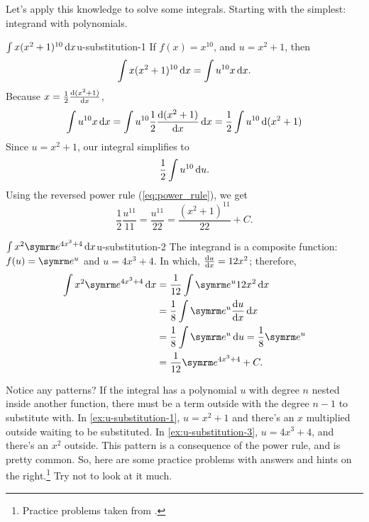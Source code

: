 Let's apply this knowledge to solve some integrals. Starting with the simplest: integrand with polynomials.
\begin{exmp}{$\int x(x^2 + 1)^{10}\odif{x}$}{u-substitution-1}
  If $f(x) = x^{10}$, and $u = x^2 + 1$, then
  \begin{equation}
    \int x(x^2 + 1)^{10}\odif{x} = \int u^{10}x\odif{x}.
  \end{equation}
  Because $x = \frac{1}{2}\odv{(x^2 + 1)}{x}$,
  \begin{equation}
    \int u^{10}x\odif{x} = \int u^{10}\frac{1}{2}\odv{(x^2 + 1)}{x}\odif{x} = \frac{1}{2}\int u^{10}\odif{(x^2 + 1)}
  \end{equation}
  Since $u = x^2 + 1$, our integral simplifies to
  \begin{equation}
    \frac{1}{2}\int u^{10}\odif{u}.
  \end{equation}
  Using the reversed power rule (\cref{eq:power_rule}), we get
  \begin{equation}
    \frac{1}{2}\frac{u^{11}}{11} = \frac{u^{11}}{22} = \frac{(x^2 + 1)^{11}}{22} + C.
  \end{equation}
\end{exmp}

\begin{exmp}{$\int x^2\e^{4x^3 + 4}\odif{x}$}{u-substitution-2}
  The integrand is a composite function: $f(u) = \e^u$ and $u = 4x^3 + 4$. In which, $\odv{u}{x} = 12x^2$; therefore,
  \begin{align}
    \int x^2\e^{4x^3 + 4}\odif{x} & = \frac{1}{12}\int\e^u 12x^2 \odif{x}           \\
                                  & = \frac{1}{8}\int\e^u\odv{u}{x}\odif{x}         \\
                                  & = \frac{1}{8}\int\e^u\odif{u} = \frac{1}{8}\e^u \\
                                  & = \frac{1}{12}\e^{4x^3 + 4} + C.
  \end{align}
\end{exmp}

Notice any patterns? If the integral has a polynomial $u$ with degree $n$ nested inside another function, there must be a term outside with the degree $n - 1$ to substitute with. In \cref{ex:u-substitution-1}, $u = x^2 + 1$ and there's an $x$ multiplied outside waiting to be substituted. In \cref{ex:u-substitution-3}, $u = 4x^3 + 4$, and there's an $x^2$ outside. This pattern is a consequence of the power rule, and is pretty common. So, here are some practice problems with answers and hints on the right.\footnote{Practice problems taken from \cite{foster-no-date}.} Try not to look at it much.

